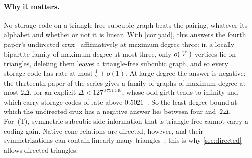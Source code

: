 \paragraph{Why it matters.} No storage code on a triangle-free subcubic graph beats the pairing, whatever its alphabet
and whether or not it is linear. With \cref{cor:paid}, this answers the fourth paper's undirected
crux~\cite[Question~6.1]{FourthPaper2026} affirmatively at maximum degree three: in a locally bipartite family of maximum
degree at most three, only $o(\lvert V \rvert)$ vertices lie on triangles, deleting them leaves a triangle-free subcubic graph, and
so every storage code has rate at most $\frac12+o(1)$. At large degree the answer is negative: the thirteenth paper of
the series gives a family of graphs of maximum degree at most $2\Delta$, for an explicit $\Delta<127^{8\,791\,448}$,
whose odd girth tends to infinity and which carry storage codes of rate above
$0.5021$~\cite[Corollary~U]{StorageCodes2026}. So the least degree bound at which the undirected crux has a negative
answer lies between four and~$2\Delta$. For~(T), symmetric subcubic side
information that is triangle-free cannot carry a coding gain. Native cone relations are directed, however, and their
symmetrizations can contain linearly many triangles~\cite[Proposition~3.10]{DirectedRecovery2026}; this is why
\cref{sec:directed} allows directed triangles.
